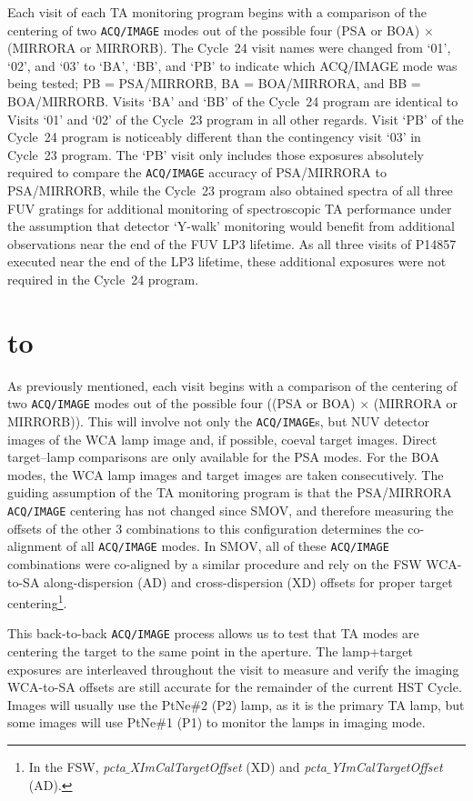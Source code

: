 \documentclass[12pt]{reportj}
\newcommand{\pid}[1]{{\rm P}#1}
\newcommand{\tacq}[1]{\texttt{ACQ/#1}}
\def\ssection#1{\addtocounter{section}{1} \setcounter{subsection}{0} \section*{\hbox to \hsize{\large\bf \arabic{section}. #1\hfill }}}
\begin{document}
Each visit of each TA monitoring program begins with a comparison of the centering of two \tacq{IMAGE} modes out of the possible four (PSA or BOA) $\times$ (MIRRORA or MIRRORB). The Cycle~24 visit names were changed from `01', `02', and `03' to `BA', `BB', and `PB' to indicate which ACQ/IMAGE mode was being tested; PB = PSA/MIRRORB, BA = BOA/MIRRORA, and BB = BOA/MIRRORB. Visits `BA' and `BB' of the Cycle~24 program are identical to Visits `01' and `02' of the Cycle~23 program in all other regards.
Visit `PB' of the Cycle~24 program is noticeably different than the contingency visit `03' in Cycle~23 program. The `PB' visit only includes those exposures absolutely required to compare the \tacq{IMAGE} accuracy of PSA/MIRRORA to PSA/MIRRORB, while the Cycle~23 program also obtained spectra of all three FUV gratings for additional monitoring of spectroscopic TA performance under the assumption that detector `Y-walk' monitoring would benefit from additional observations near the end of the FUV LP3 lifetime. As all three visits of \pid{14857} executed near the end of the LP3 lifetime, these additional exposures were not required in the Cycle~24 program.
\clearpage
\ssection{Cycle~24 (\pid{14857}) Program Structure \label{sec:structure}}
As previously mentioned, each visit begins with a comparison of the centering of two \tacq{IMAGE} modes out of the possible four ((PSA or BOA) $\times$ (MIRRORA or MIRRORB)). This will involve not only the \tacq{IMAGE}s, but NUV detector images of the WCA lamp image and, if possible, coeval target images. Direct target--lamp comparisons are only available for the PSA modes. For the BOA modes, the WCA lamp images and target images are taken consecutively. The guiding assumption of the TA monitoring program is that the PSA/MIRRORA \tacq{IMAGE} centering has not changed since SMOV, and therefore measuring the offsets of the other 3 combinations to this configuration determines the co-alignment of all \tacq{IMAGE} modes. In SMOV, all of these \tacq{IMAGE} combinations were co-aligned by a similar procedure and rely on the FSW WCA-to-SA along-dispersion (AD) and cross-dispersion (XD) offsets for proper target centering\footnote{In the FSW, {\it pcta$\_$XImCalTargetOffset} (XD) and {\it pcta$\_$YImCalTargetOffset} (AD).}.

This back-to-back \tacq{IMAGE} process allows us to test that TA modes are centering the target to the same point in the aperture. The lamp+target exposures are interleaved throughout the visit to measure and verify the imaging WCA-to-SA offsets are still accurate for the remainder of the current HST Cycle. Images will usually use the PtNe\#2 (P2) lamp, as it is the primary TA lamp, but some images will use PtNe\#1 (P1) to monitor the lamps in imaging mode.
\end{document}
